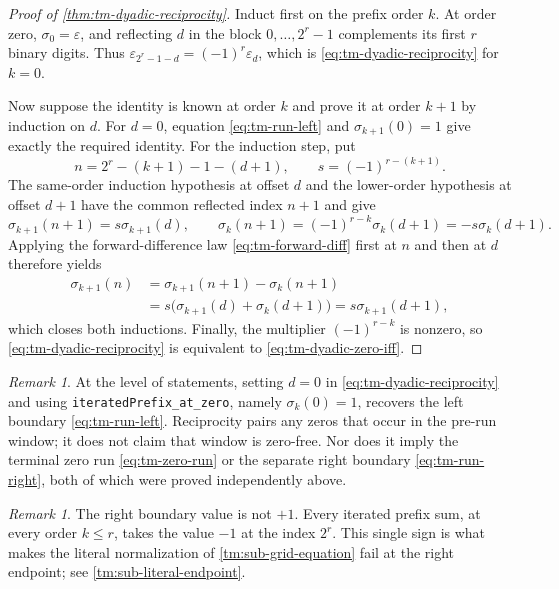 \documentclass[11pt,oneside]{article}
\theoremstyle{definition}
\theoremstyle{remark}
\newtheorem{remark}[theorem]{Remark}
\newcommand{\lean}[1]{%
  \ifmmode\text{\nolinkurl{#1}}\else\nolinkurl{#1}\fi}
\begin{document}
\begin{proof}[Proof of \cref{thm:tm-dyadic-reciprocity}]
Induct first on the prefix order $k$.  At order zero, $\sigma_0=\varepsilon$, and
reflecting $d$ in the block $0,\ldots,2^r-1$ complements its first $r$ binary
digits.  Thus
$\varepsilon_{2^r-1-d}=(-1)^r\varepsilon_d$, which is
\eqref{eq:tm-dyadic-reciprocity} for $k=0$.

Now suppose the identity is known at order $k$ and prove it at order $k+1$ by
induction on $d$.  For $d=0$, equation \eqref{eq:tm-run-left} and
$\sigma_{k+1}(0)=1$ give exactly the required identity.  For the induction
step, put
\[
 n=2^r-(k+1)-1-(d+1),
 \qquad s=(-1)^{r-(k+1)}.
\]
The same-order induction hypothesis at offset $d$ and the lower-order
hypothesis at offset $d+1$ have the common reflected index $n+1$ and give
\[
 \sigma_{k+1}(n+1)=s\sigma_{k+1}(d),
 \qquad
 \sigma_k(n+1)=(-1)^{r-k}\sigma_k(d+1)=-s\sigma_k(d+1).
\]
Applying the forward-difference law \eqref{eq:tm-forward-diff} first at $n$
and then at $d$ therefore yields
\begin{align*}
 \sigma_{k+1}(n)
 &=\sigma_{k+1}(n+1)-\sigma_k(n+1)\\
 &=s\bigl(\sigma_{k+1}(d)+\sigma_k(d+1)\bigr)
  =s\sigma_{k+1}(d+1),
\end{align*}
which closes both inductions.  Finally, the multiplier $(-1)^{r-k}$ is
nonzero, so \eqref{eq:tm-dyadic-reciprocity} is equivalent to
\eqref{eq:tm-dyadic-zero-iff}.
\end{proof}

\begin{remark}
At the level of statements, setting $d=0$ in
\eqref{eq:tm-dyadic-reciprocity} and using
\lean{iteratedPrefix_at_zero}, namely $\sigma_k(0)=1$, recovers the left
boundary \eqref{eq:tm-run-left}.  Reciprocity pairs any zeros that occur in
the pre-run window; it does not claim that window is zero-free.  Nor does it
imply the terminal zero run \eqref{eq:tm-zero-run} or the separate right
boundary \eqref{eq:tm-run-right}, both of which were proved independently
above.
\end{remark}

\begin{remark}
The right boundary value is not $+1$.  Every iterated prefix sum, at every order
$k\le r$, takes the value $-1$ at the index $2^r$.  This single sign is what makes the
literal normalization of \cref{tm:sub-grid-equation} fail at the right endpoint; see
\cref{tm:sub-literal-endpoint}.
\end{remark}
\end{document}
